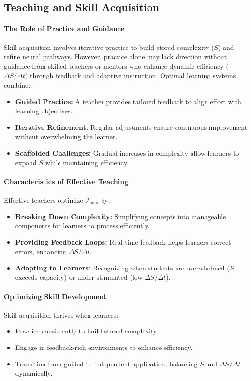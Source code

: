 \documentclass[12pt]{article}
\begin{document}
\subsection{Teaching and Skill Acquisition}
\paragraph{The Role of Practice and Guidance}
Skill acquisition involves iterative practice to build stored complexity (\( S \)) and refine neural pathways. However, practice alone may lack direction without guidance from skilled teachers or mentors who enhance dynamic efficiency (\( \Delta S / \Delta t \)) through feedback and adaptive instruction. Optimal learning systems combine:
\begin{itemize}
    \item \textbf{Guided Practice:} A teacher provides tailored feedback to align effort with learning objectives.
    \item \textbf{Iterative Refinement:} Regular adjustments ensure continuous improvement without overwhelming the learner.
    \item \textbf{Scaffolded Challenges:} Gradual increases in complexity allow learners to expand \( S \) while maintaining efficiency.
\end{itemize}

\paragraph{Characteristics of Effective Teaching}
Effective teachers optimize \(\mathcal{I}_{\text{max}}\) by:
\begin{itemize}
    \item \textbf{Breaking Down Complexity:} Simplifying concepts into manageable components for learners to process efficiently.
    \item \textbf{Providing Feedback Loops:} Real-time feedback helps learners correct errors, enhancing \( \Delta S / \Delta t \).
    \item \textbf{Adapting to Learners:} Recognizing when students are overwhelmed (\( S \) exceeds capacity) or under-stimulated (low \( \Delta S / \Delta t \)).
\end{itemize}

\paragraph{Optimizing Skill Development}
Skill acquisition thrives when learners:
\begin{itemize}
    \item Practice consistently to build stored complexity.
    \item Engage in feedback-rich environments to enhance efficiency.
    \item Transition from guided to independent application, balancing \( S \) and \( \Delta S / \Delta t \) dynamically.
\end{itemize}
\end{document}
